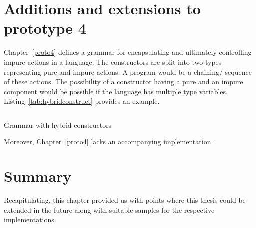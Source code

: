 \documentclass[thesis-solanki.tex]{subfiles}
\begin{document}
\section{Additions and extensions to prototype 4}
Chapter~\ref{proto4} defines a grammar for encapsulating and ultimately controlling impure actions in a language.
The constructors are split into two types representing pure and impure actions.
A program would be a chaining/ sequence of these actions.
The possibility of a constructor having a pure and an impure component would be possible if the language has
multiple type variables.
Listing~\ref{tab:hybridconstruct} provides an example.


\begin{code-list}[H]
\begin{singlespace}
\inputminted{haskell}{haskell-proto4-hybrid-construct.hs}
\end{singlespace}
\caption{Grammar with hybrid constructors}
\label{tab:hybridconstruct}
\end{code-list}

Moreover, Chapter~\ref{proto4} lacks an accompanying implementation.

\section{Summary}
Recapitulating, this chapter provided us with points where this thesis could be extended in the future along with
suitable samples for the respective implementations.


\ifMain\ifDraft
\begin{scope}
  \nolinenumbers
  \enotesize
  \par
  \begin{singlespace}
  \setlength{\parskip}{12pt plus 2pt minus 1pt}
  \theendnotes
  \par
  \end{singlespace}
\end{scope}
\fi\fi
\end{document}
